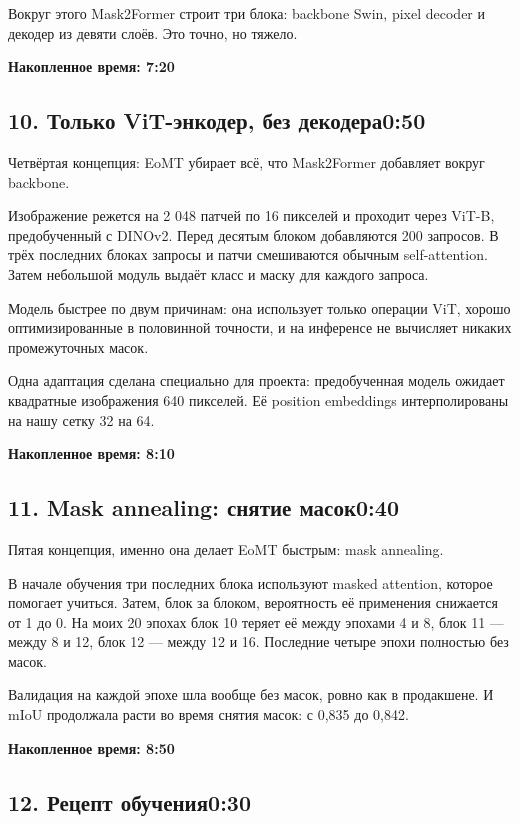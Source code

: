 \documentclass[11pt,a4paper]{article}
\newcommand{\cumul}[1]{\par{\hfill\small\color{accent}\bfseries #1}\par}
\newcommand{\tempo}[1]{\hfill{\normalsize\color{accent}#1}}
\begin{document}
Вокруг этого Mask2Former строит три блока: backbone Swin, pixel decoder и декодер из девяти слоёв. Это точно, но тяжело.

\cumul{Накопленное время: 7:20}

\subsection*{10. Только ViT-энкодер, без декодера\tempo{0:50}}

Четвёртая концепция: EoMT убирает всё, что Mask2Former добавляет вокруг backbone.

Изображение режется на 2 048 патчей по 16 пикселей и проходит через ViT-B, предобученный с DINOv2. Перед десятым блоком добавляются 200 запросов. В трёх последних блоках запросы и патчи смешиваются обычным self-attention. Затем небольшой модуль выдаёт класс и маску для каждого запроса.

Модель быстрее по двум причинам: она использует только операции ViT, хорошо оптимизированные в половинной точности, и на инференсе не вычисляет никаких промежуточных масок.

Одна адаптация сделана специально для проекта: предобученная модель ожидает квадратные изображения 640 пикселей. Её position embeddings интерполированы на нашу сетку 32 на 64.

\cumul{Накопленное время: 8:10}

\subsection*{11. Mask annealing: снятие масок\tempo{0:40}}

Пятая концепция, именно она делает EoMT быстрым: mask annealing.

В начале обучения три последних блока используют masked attention, которое помогает учиться. Затем, блок за блоком, вероятность её применения снижается от 1 до 0. На моих 20 эпохах блок 10 теряет её между эпохами 4 и 8, блок 11 — между 8 и 12, блок 12 — между 12 и 16. Последние четыре эпохи полностью без масок.

Валидация на каждой эпохе шла вообще без масок, ровно как в продакшене. И mIoU продолжала расти во время снятия масок: с 0,835 до 0,842.

\cumul{Накопленное время: 8:50}

\subsection*{12. Рецепт обучения\tempo{0:30}}
\end{document}
